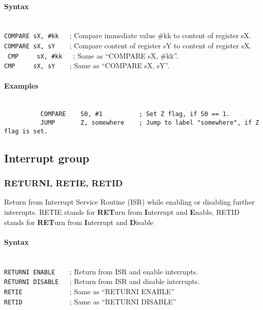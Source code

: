             \paragraph{Syntax}
                ~\\
                \verb'COMPARE sX, #kk   '; Compare immediate value \#kk to content of register sX.\\
                \verb'COMPARE sX, sY    '; Compare content of register sY to content of register sX.\\\
                \verb'CMP     sX, #kk   '; Same as ``COMPARE sX, \#kk''.\\
                \verb'CMP     sX, sY    '; Same as ``COMPARE sX, sY''.

            \paragraph{Examples}
                ~\\
                \verb'          COMPARE    S0, #1          ; Set Z flag, if S0 == 1.'\\
                \verb'          JUMP       Z, somewhere    ; Jump to label "somewhere", if Z flag is set.'

    \subsection{Interrupt group}
        \subsubsection{RETURNI, RETIE, RETID}
            Return from Interrupt Service Routine (ISR) while enabling or disabling further interrupts. RETIE stands for \textbf{RET}urn from \textbf{I}nterrupt and \textbf{E}nable, RETID stands for \textbf{RET}urn from \textbf{I}nterrupt and \textbf{D}isable

            \paragraph{Syntax}
                ~\\
                \verb'RETURNI ENABLE    '; Return from ISR and enable interrupts.\\
                \verb'RETURNI DISABLE   '; Return from ISR and disable interrupts.\\
                \verb'RETIE             '; Same as ``RETURNI ENABLE''\\
                \verb'RETID             '; Same as ``RETURNI DISABLE''

